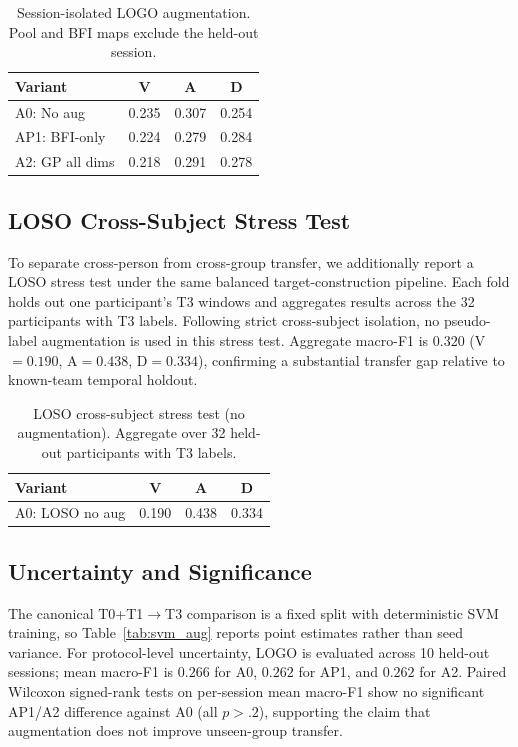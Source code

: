 \documentclass[sigconf,review,anonymous]{acmart}
\begin{document}
\begin{table}[t]
\caption{Session-isolated LOGO augmentation. Pool and BFI maps exclude the
held-out session.}
\label{tab:logo}
\centering
\setlength{\tabcolsep}{4pt}
\small
\begin{tabular}{lccc}
\toprule
\textbf{Variant} & \textbf{V} & \textbf{A} & \textbf{D} \\
\midrule
A0: No aug     & 0.235 & 0.307 & 0.254 \\
AP1: BFI-only  & 0.224 & 0.279 & 0.284 \\
A2: GP all dims& 0.218 & 0.291 & 0.278 \\
\bottomrule
\end{tabular}
\end{table}

\subsection{LOSO Cross-Subject Stress Test}
\label{sec:loso}

To separate cross-person from cross-group transfer, we additionally report a
LOSO stress test under the same balanced target-construction pipeline.
Each fold holds out one participant's T3 windows and aggregates results across
the 32 participants with T3 labels.
Following strict cross-subject isolation, no pseudo-label augmentation is used
in this stress test.
Aggregate macro-F1 is $0.320$ (V$=0.190$, A$=0.438$, D$=0.334$), confirming a
substantial transfer gap relative to known-team temporal holdout.

\begin{table}[t]
\caption{LOSO cross-subject stress test (no augmentation).
Aggregate over 32 held-out participants with T3 labels.}
\label{tab:loso}
\centering
\setlength{\tabcolsep}{4pt}
\small
\begin{tabular}{lccc}
\toprule
\textbf{Variant} & \textbf{V} & \textbf{A} & \textbf{D} \\
\midrule
A0: LOSO no aug & 0.190 & 0.438 & 0.334 \\
\bottomrule
\end{tabular}
\end{table}

\subsection{Uncertainty and Significance}
\label{sec:uncertainty}

The canonical T0+T1$\rightarrow$T3 comparison is a fixed split with
deterministic SVM training, so Table~\ref{tab:svm_aug} reports point
estimates rather than seed variance.
For protocol-level uncertainty, LOGO is evaluated across 10 held-out
sessions; mean macro-F1 is $0.266$ for A0, $0.262$ for AP1, and $0.262$ for
A2.
Paired Wilcoxon signed-rank tests on per-session mean macro-F1 show no
significant AP1/A2 difference against A0 (all $p>.2$), supporting the claim
that augmentation does not improve unseen-group transfer.
\end{document}
